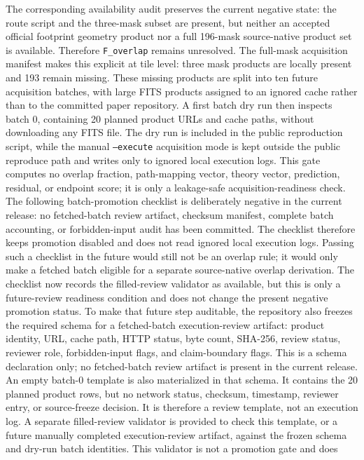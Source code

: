 \documentclass[11pt]{article}
\begin{document}
The corresponding availability audit preserves the current negative state: the
route script and the three-mask subset are present, but neither an accepted
official footprint geometry product nor a full 196-mask source-native product
set is available. Therefore \texttt{F\_\allowbreak{}overlap} remains unresolved.
The full-mask acquisition manifest makes this explicit at tile level: three
mask products are locally present and 193 remain missing.
These missing products are split into ten future acquisition batches, with
large FITS products assigned to an ignored cache rather than to the committed
paper repository.
A first batch dry run then inspects batch 0, containing 20 planned product URLs
and cache paths, without downloading any FITS file. The dry run is included in
the public reproduction script, while the manual \texttt{--execute} acquisition
mode is kept outside the public reproduce path and writes only to ignored local
execution logs. This gate computes no overlap fraction, path-mapping vector,
theory vector, prediction, residual, or endpoint score; it is only a
leakage-safe acquisition-readiness check.
The following batch-promotion checklist is deliberately negative in the current
release: no fetched-batch review artifact, checksum manifest, complete batch
accounting, or forbidden-input audit has been committed. The checklist therefore
keeps promotion disabled and does not read ignored local execution logs. Passing
such a checklist in the future would still not be an overlap rule; it would only
make a fetched batch eligible for a separate source-native overlap derivation.
The checklist now records the filled-review validator as available, but this is
only a future-review readiness condition and does not change the present
negative promotion status.
To make that future step auditable, the repository also freezes the required
schema for a fetched-batch execution-review artifact: product identity, URL,
cache path, HTTP status, byte count, SHA-256, review status, reviewer role,
forbidden-input flags, and claim-boundary flags. This is a schema declaration
only; no fetched-batch review artifact is present in the current release.
An empty batch-0 template is also materialized in that schema. It contains the
20 planned product rows, but no network status, checksum, timestamp, reviewer
entry, or source-freeze decision. It is therefore a review template, not an
execution log.
A separate filled-review validator is provided to check this template, or a
future manually completed execution-review artifact, against the frozen schema
and dry-run batch identities. This validator is not a promotion gate and does
\end{document}
